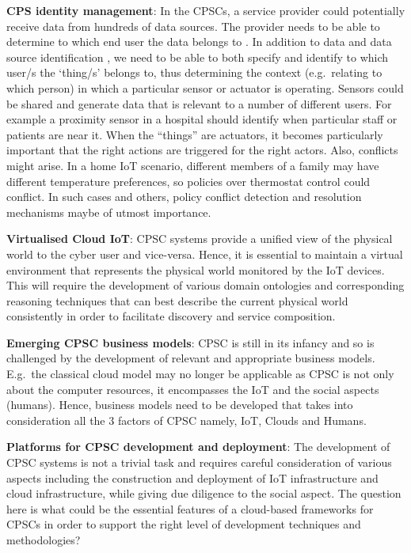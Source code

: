 \textbf{CPS identity management}:
In the CPSCs, a service provider could potentially receive data from hundreds of data sources.
The provider needs to be able to determine to which end user the data belongs to \cite{ref3}.
In addition to data and data source identification \cite{ref3}, we need to be able to both specify and identify to which user/s the `thing/s' belongs to,
thus determining the context (e.g.~relating to which person) in which a particular sensor or actuator is operating.
Sensors could be shared and generate data that is relevant to a number of different users.
For example a proximity sensor in a hospital should identify when particular staff or patients are near it.
When the ``things'' are actuators, it becomes particularly important that the right actions are triggered for the right actors.
Also, conflicts might arise.
In a home IoT scenario, different members of a family may have different temperature preferences, so policies over thermostat control could conflict.
In such cases and others, policy conflict detection and resolution mechanisms maybe of utmost importance. 

\textbf{Virtualised Cloud IoT}:
CPSC systems provide a unified view of the physical world to the cyber user and vice-versa.
Hence, it is essential to maintain a virtual environment that represents the physical world monitored by the IoT devices.
This will require the development of various domain ontologies and corresponding reasoning techniques that can best describe the current physical world consistently in order to facilitate discovery and service composition.

\textbf{Emerging CPSC business models}:
CPSC is still in its infancy and so is challenged by the development of relevant and appropriate business models.
E.g.~the classical cloud model may no longer be applicable as CPSC is not only about the computer resources, it encompasses the IoT and the social aspects (humans).
Hence, business models need to be developed that takes into consideration all the 3 factors of CPSC namely, IoT, Clouds and Humans.

\textbf{Platforms for CPSC development and deployment}:
The development of CPSC systems is not a trivial task and requires careful consideration of various aspects including the construction and deployment of IoT infrastructure and cloud infrastructure,
while giving due diligence to the social aspect.
The question here is what could be the essential features of a cloud-based frameworks for CPSCs in order to support the right level of development techniques and methodologies?



